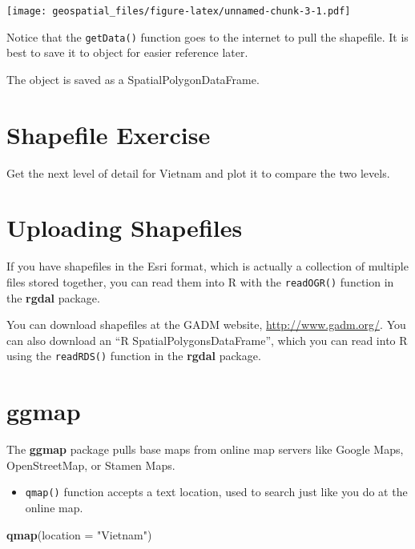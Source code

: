 \documentclass[oneside]{memoir}
\newenvironment{Shaded}{\begin{snugshade}}{\end{snugshade}}
\newcommand{\KeywordTok}[1]{\textcolor[rgb]{0.13,0.29,0.53}{\textbf{#1}}}
\newcommand{\DataTypeTok}[1]{\textcolor[rgb]{0.13,0.29,0.53}{#1}}
\newcommand{\StringTok}[1]{\textcolor[rgb]{0.31,0.60,0.02}{#1}}
\newcommand{\NormalTok}[1]{#1}
\providecommand{\tightlist}{%
  \setlength{\itemsep}{0pt}\setlength{\parskip}{0pt}}
\theoremstyle{definition}
\theoremstyle{definition}
\theoremstyle{definition}
\theoremstyle{remark}
\begin{document}
\texttt{[image: geospatial\_files/figure-latex/unnamed-chunk-3-1.pdf]}

Notice that the \texttt{getData()} function goes to the internet to pull
the shapefile. It is best to save it to object for easier reference
later.

The object is saved as a SpatialPolygonDataFrame.

\section{Shapefile Exercise}\label{shapefile-exercise}

Get the next level of detail for Vietnam and plot it to compare the two
levels.

\section{Uploading Shapefiles}\label{uploading-shapefiles}

If you have shapefiles in the Esri format, which is actually a
collection of multiple files stored together, you can read them into R
with the \texttt{readOGR()} function in the \textbf{rgdal} package.

You can download shapefiles at the GADM website,
\url{http://www.gadm.org/}. You can also download an ``R
SpatialPolygonsDataFrame'', which you can read into R using the
\texttt{readRDS()} function in the \textbf{rgdal} package.

\section{ggmap}\label{ggmap}

The \textbf{ggmap} package pulls base maps from online map servers like
Google Maps, OpenStreetMap, or Stamen Maps.

\begin{itemize}
\tightlist
\item
  \texttt{qmap()} function accepts a text location, used to search just
  like you do at the online map.
\end{itemize}

\begin{Shaded}
\begin{Highlighting}[]
\KeywordTok{qmap}\NormalTok{(}\DataTypeTok{location =} \StringTok{"Vietnam"}\NormalTok{)}
\end{Highlighting}
\end{Shaded}
\end{document}
